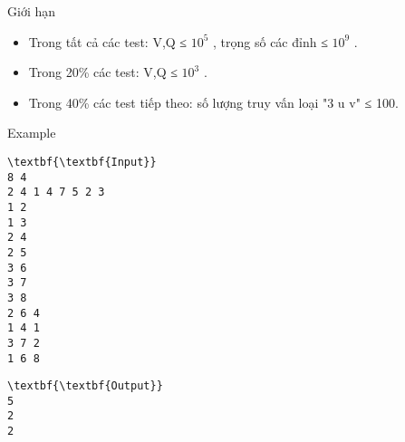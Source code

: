 Giới hạn
\begin{itemize}
	\item Trong tất cả các test: V,Q ≤ $10^{5}$ , trọng số các đỉnh ≤ $10^{9}$ .
	\item Trong 20\% các test: V,Q ≤ $10^{3}$ .
	\item Trong 40\% các test tiếp theo: số lượng truy vấn loại "3 u v" ≤ 100.
\end{itemize}
Example
\begin{verbatim}
\textbf{\textbf{Input}}
8 4
2 4 1 4 7 5 2 3
1 2
1 3
2 4
2 5
3 6
3 7
3 8
2 6 4
1 4 1
3 7 2
1 6 8
\end{verbatim}
\begin{verbatim}
\textbf{\textbf{Output}}
5
2
2\end{verbatim}